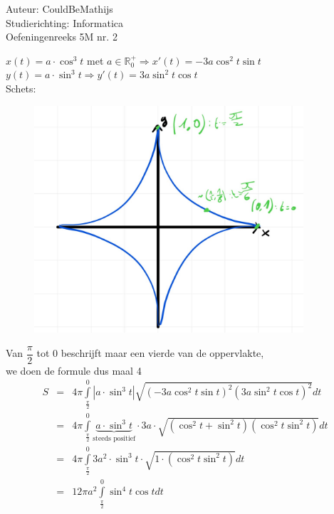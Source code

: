\documentclass[a4paper]{article}
\newcommand{\bint}{\displaystyle\int\limits}
\begin{document}
  
\noindent \large Auteur: CouldBeMathijs \\
\noindent \large Studierichting: Informatica\\
\noindent \large Oefeningenreeks 5M nr. 2\\

\medskip

\normalsize

$x(t) = a \cdot \cos^3t$ met $a \in \mathbb{R}_0^+ \Rightarrow x'(t)= -3a \cos^2t \sin t$\\

$y(t) = a \cdot \sin^3t \Rightarrow y'(t)= 3a \sin^2t \cos t$\\

Schets:\\

\begin{figure}[h]
\centering
\includegraphics[width=10cm]{5M-2-could.be.mathijs.INF.jpg}
\end{figure}

Van $\dfrac{\pi}{2}$ tot $0$ beschrijft maar een vierde van de oppervlakte,\\

we doen de formule dus maal 4\\

\begin{eqnarray*}
S &=& 4 \pi \bint_{\tfrac{\pi}{2}}^0 |a\cdot\sin^3t| \sqrt{\left(-3a\cos^2t\sin t\right)^2\left(3a\sin^2t\cos t\right)^2}dt\\
&=& 4 \pi \bint_{\tfrac{\pi}{2}}^0 \underbrace{a \cdot \sin^3 t}_{\text{steeds positief}} \cdot 3a \cdot \sqrt{(\cos^2t+\sin^2t)(\cos^2t\sin^2t)}dt\\
&=& 4 \pi \bint_{\tfrac{\pi}{2}}^0 3a^2 \cdot \sin^3 t \cdot \sqrt{1 \cdot (\cos^2t\sin^2t)}dt\\
&=& 12 \pi a^2 \bint_{\tfrac{\pi}{2}}^0 \sin^4t \cos t dt\\
\end{eqnarray*}
\end{document}
